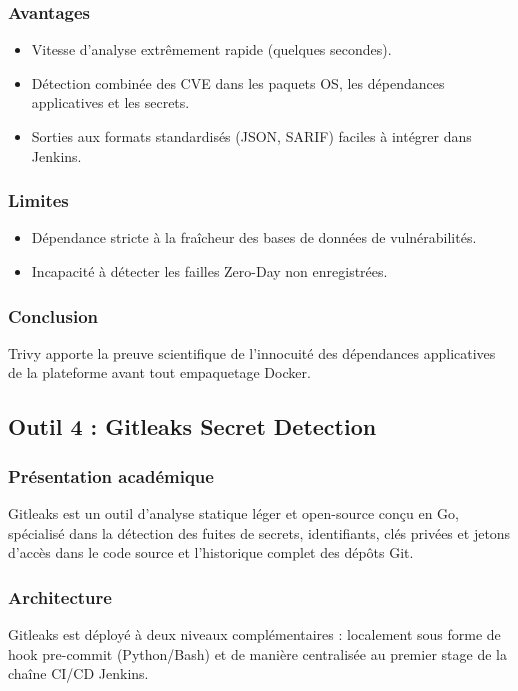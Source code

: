 \subsubsection{Avantages}
\begin{itemize}
    \item Vitesse d'analyse extrêmement rapide (quelques secondes).
    \item Détection combinée des CVE dans les paquets OS, les dépendances applicatives et les secrets.
    \item Sorties aux formats standardisés (JSON, SARIF) faciles à intégrer dans Jenkins.
\end{itemize}

\subsubsection{Limites}
\begin{itemize}
    \item Dépendance stricte à la fraîcheur des bases de données de vulnérabilités.
    \item Incapacité à détecter les failles Zero-Day non enregistrées.
\end{itemize}

\subsubsection{Conclusion}
Trivy apporte la preuve scientifique de l'innocuité des dépendances applicatives de la plateforme avant tout empaquetage Docker.

\subsection{Outil 4 : Gitleaks Secret Detection}
\label{subsec:outil_gitleaks}

\subsubsection{Présentation académique}
Gitleaks est un outil d'analyse statique léger et open-source conçu en Go, spécialisé dans la détection des fuites de secrets, identifiants, clés privées et jetons d'accès dans le code source et l'historique complet des dépôts Git.

\subsubsection{Architecture}
Gitleaks est déployé à deux niveaux complémentaires : localement sous forme de hook pre-commit (Python/Bash) et de manière centralisée au premier stage de la chaîne CI/CD Jenkins.

